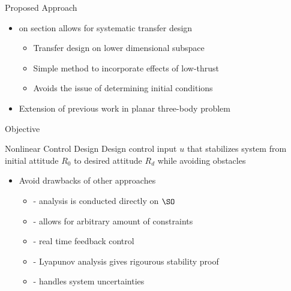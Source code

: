 

\begin{frame}{Proposed Approach} %
  \begin{itemize}
      \item {} on \Poincare section allows for systematic transfer design
        \begin{itemize}
            \item Transfer design on lower dimensional subspace
            \item Simple method to incorporate effects of low-thrust 
            \item Avoids the issue of determining initial conditions
        \end{itemize}
        \pause
      \item Extension of previous work in planar three-body problem     
  \end{itemize}

\end{frame} %

\begin{frame}{Objective} %

  \begin{block}{Nonlinear Control Design}
    Design control input \( u \) that stabilizes system from initial attitude \( R_0 \) to desired attitude \( R_d \) while avoiding obstacles
  \end{block}
  \pause
  \vs
  \begin{itemize}
    \item Avoid drawbacks of other approaches 
    \begin{itemize}
      \item {} - analysis is conducted directly on \( \SO \) 
      \item {} - allows for arbitrary amount of constraints
      \item {} - real time feedback control
      \item {} - Lyapunov analysis gives rigourous stability proof
      \item {} - handles system uncertainties
    \end{itemize}
  \end{itemize}
\end{frame}